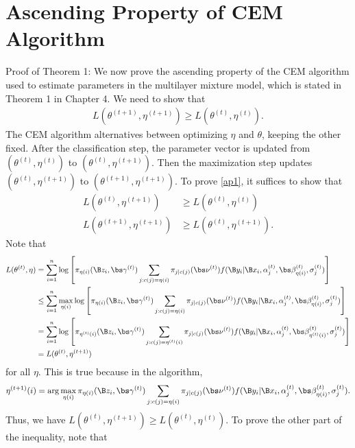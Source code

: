 \chapter{Ascending Property of CEM Algorithm}

   Proof of Theorem 1: We now prove the ascending property of the CEM algorithm used to estimate parameters in the multilayer mixture model, which is stated in Theorem 1 in Chapter 4. We need to show that
    \begin{align}\label{ap1}L(\theta^{(t+1)},\eta^{(t+1)})\geq L(\theta^{(t)},\eta^{(t)}).\end{align}
    The CEM algorithm alternatives between optimizing $\eta$ and $\theta$, keeping the other fixed. After the classification step, the parameter vector is updated from $(\theta^{(t)},\eta^{(t)})$ to $(\theta^{(t)},\eta^{(t+1)})$. Then the maximization step updates $(\theta^{(t)},\eta^{(t+1)})$ to $(\theta^{(t+1)},\eta^{(t+1)})$. To prove \ref{ap1}, it suffices to show that
    \begin{align*}
    L(\theta^{(t)},\eta^{(t+1)})&\geq L(\theta^{(t)},\eta^{(t)})\\
    L(\theta^{(t+1)},\eta^{(t+1)})&\geq L(\theta^{(t)},\eta^{(t+1)}).
    \end{align*}
    Note that 
    \begin{align*}
 L(\theta^{(t)},\eta)&=\sum^{n}_{i=1}\log\left[\pi_{\eta(i)}(\B z_{i},\bs \gamma^{(t)})\sum_{j:c(j)=\eta(i)}\pi_{j|c(j)}(\bs\nu^{(t)})f(\B y_{i}|\B x_{i},\alpha_{j}^{(t)},\bs\beta^{(t)}_{\eta(i)},\sigma^{(t)}_{j})\right]\\
 &\leq \sum^{n}_{i=1}\max_{\eta(i)}\log\left[\pi_{\eta(i)}(\B z_{i},\bs \gamma^{(t)})\sum_{j:c(j)=\eta(i)}\pi_{j|c(j)}(\bs\nu^{(t)})f(\B y_{i}|\B x_{i},\alpha_{j}^{(t)},\bs\beta^{(t)}_{\eta(i)},\sigma^{(t)}_{j})\right]\\
  &= \sum^{n}_{i=1}\log\left[\pi_{\eta^{(t)}(i)}(\B z_{i},\bs \gamma^{(t)})\sum_{j:c(j)=\eta^{(t)}(i)}\pi_{j|c(j)}(\bs\nu^{(t)})f(\B y_{i}|\B x_{i},\alpha_{j}^{(t)},\bs\beta^{(t)}_{\eta^{(t)}(i)},\sigma^{(t)}_{j})\right]\\
  &= L(\theta^{(t)},\eta^{(t+1)})
    \end{align*}
for all $\eta$. This is true because in the algorithm, $$\eta^{(t+1)}(i) = \arg \max_{\eta(i)} \pi_{\eta(i)}(\B z_{i},\bs \gamma^{(t)})\sum_{j:c(j)=\eta(i)}\pi_{j|c(j)}(\bs\nu^{(t)})f(\B y_{i}|\B x_{i},\alpha_{j}^{(t)},\bs\beta^{(t)}_{\eta(i)},\sigma^{(t)}_{j}).$$
   Thus, we have $    L(\theta^{(t)},\eta^{(t+1)})\geq L(\theta^{(t)},\eta^{(t)})$. To prove the other part of the inequality, note that
